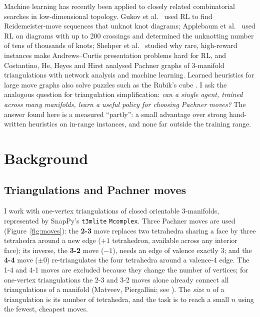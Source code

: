 \documentclass[10pt,a4paper]{article}
\begin{document}
Machine learning has recently been applied to closely related combinatorial searches in low-dimensional topology.
Gukov et al.\ \cite{unknot} used RL to find Reidemeister-move sequences that unknot knot diagrams;
Applebaum et al.\ \cite{applebaum} used RL on diagrams with up to 200 crossings and determined the unknotting number of tens of thousands of knots;
Shehper et al.\ \cite{shehper} studied why rare, high-reward instances make Andrews--Curtis presentation problems hard for RL, and
Costantino, He, Heyes and Hirst \cite{chhh} analysed Pachner graphs of 3-manifold triangulations with network analysis and machine learning.
Learned heuristics for large move graphs also solve puzzles such as the Rubik's cube \cite{deepcubea}.
I ask the analogous question for triangulation simplification: \emph{can a single agent, trained across many manifolds, learn a useful policy for choosing Pachner moves?}
The answer found here is a measured ``partly'': a small advantage over strong hand-written heuristics on in-range instances, and none far outside the training range.

\section{Background}
\subsection{Triangulations and Pachner moves}
I work with one-vertex triangulations of closed orientable 3-manifolds, represented by SnapPy's \texttt{t3mlite} \texttt{Mcomplex}. Three Pachner moves are used (Figure~\ref{fig:moves}):
the \textbf{2-3} move replaces two tetrahedra sharing a face by three tetrahedra around a new edge ($+1$ tetrahedron, available across any interior face);
its inverse, the \textbf{3-2} move ($-1$), needs an edge of valence exactly 3; and the \textbf{4-4} move ($\pm0$) re-triangulates the four tetrahedra around a valence-4 edge.
The 1-4 and 4-1 moves are excluded because they change the number of vertices; for one-vertex triangulations the 2-3 and 3-2 moves alone already connect all triangulations of a manifold (Matveev, Piergallini; see \cite{matveev}).
The \emph{size} $n$ of a triangulation is its number of tetrahedra, and the task is to reach a small $n$ using the fewest, cheapest moves.
\end{document}
